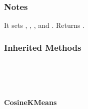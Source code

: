 \documentclass[letterpaper,10pt,english]{sphinxmanual}
\begin{document}
\begin{fulllineitems}
\begin{fulllineitems}
\subsubsection*{Notes}

It sets , , , and .
Returns .

\end{fulllineitems}

\subsubsection*{Inherited Methods}


\begin{savenotes}\sphinxatlongtablestart\begin{longtable}[c]{}
\hline

\endfirsthead

%
{}\\
\hline

\endhead

\hline
{}\\
\endfoot

\endlastfoot

\end{longtable}\sphinxatlongtableend\end{savenotes}

\end{fulllineitems}



\paragraph{CosineKMeans}
\label{\detokenize{api/generated/directional_clustering.clustering.CosineKMeans:cosinekmeans}}\label{\detokenize{api/generated/directional_clustering.clustering.CosineKMeans::doc}}
\end{document}
